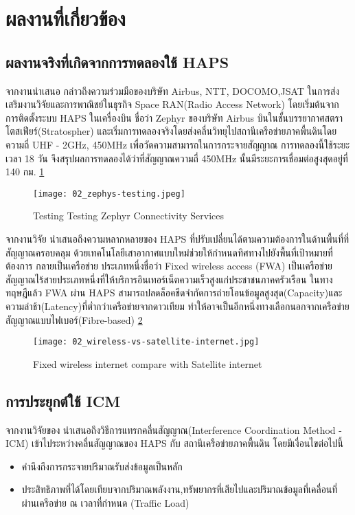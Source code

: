 \section{ผลงานที่เกี่ยวข้อง}

\subsection{ผลงานจริงที่เกิดจากการทดลองใช้ HAPS}

จากงานนำเสนอ \cite[Spacecompass]{HAPS Strategy of Space Compass}
กล่าวถึงความร่วมมือของบริษัท Airbus, NTT, DOCOMO,JSAT ในการส่งเสริมงานวิจัยและการพาณิชย์ในธุรกิจ Space RAN(Radio Access Network)
โดยเริ่มต้นจากการติดตั้งระบบ HAPS ในเครื่องบิน ชื่อว่า Zephyr ของบริษัท Airbus บินในชั้นบรรยากาศสตราโตสเฟียร์(Stratospher) 
และเริ่มการทดลองจริงโดยส่งคลื่นวิทยุไปสถานีเครือข่ายภาคพื้นดินโดยความถี่
UHF - 2GHz, 450MHz เพื่อวัดความสามารถในการกระจายสัญญาณ การทดลองนี้ใช้ระยะเวลา 18 วัน 
จึงสรุปผลการทดลองได้ว่าที่สัญญาณความถี่ 450MHz นั้นมีระยะการเชื่อมต่อสูงสุดอยู่ที่ 140 กม. \ref{fig:02-zephyr-testing}

\begin{figure}[h]
\centering
\caption[Testing Zephyr]{Testing Testing Zephyr Connectivity Services} 
\label{fig:02-zephyr-testing}
\texttt{[image: 02\_zephys-testing.jpeg]}
\end{figure}

จากงานวิจัย \cite[Towers]{High Altitude Platform Systems: Towers in the Skies}
นำเสนอถึงความหลากหลายของ HAPS ที่ปรับเปลี่ยนได้ตามความต้องการในด้านพื้นที่ที่สัญญาณครอบคลุม ด้วยเทคโนโลยีเสาอากาศแบบใหม่ช่วยให้กำหนดทิศทางไปยังพื้นที่เป้าหมายที่ต้องการ กลายเป็นเครือข่าย
ประเภทหนึ่งชื่อว่า Fixed wireless access (FWA) เป็นเครือข่ายสัญญาณไร้สายประเภทหนึ่งที่ให้บริการอินเทอร์เน็ตความเร็วสูงแก่ประชาชนภาคครัวเรือน ในทางทฤษฎีแล้ว
FWA ผ่าน HAPS สามารถปลดล็อคขีดจำกัดการถ่ายโอนข้อมูลสูงสุด(Capacity)และความล่าช้า(Latency)ที่ต่ำกว่าเครือข่ายจากดาวเทียม
ทำให้อาจเป็นอีกหนึ่งทางเลือกนอกจากเครือข่ายสัญญาณแบบไฟเบอร์(Fibre-based) \ref{fig:02-wireless-vs-satellite}

\begin{figure}[h]
\centering
\caption[wireless vs satellite]{Fixed wireless internet compare with Satellite internet}
\label{fig:02-wireless-vs-satellite}
\texttt{[image: 02\_wireless-vs-satellite-internet.jpg]}
\end{figure}

\subsection{การประยุกต์ใช้ ICM}

จากงานวิจัยของ \cite[liu2021interference]{Interference Coordination Method for Integrated HAPS-Terrestrial Networks}
นำเสนอถึงวิธีการแทรกคลื่นสัญญาณ(Interference Coordination Method - ICM) เข้าไประหว่างคลื่นสัญญาณของ HAPS กับ สถานีเครือข่ายภาคพื้นดิน โดยมีเงื่อนไขต่อไปนี้
\begin{itemize}
    \item คำนึงถึงการกระจายปริมาณรับส่งข้อมูลเป็นหลัก 
    \item ประสิทธิภาพที่ได้โดยเทียบจากปริมาณพลังงาน,ทรัพยากรที่เสียไปและปริมาณข้อมูลที่เคลื่อนที่ผ่านเครือข่าย ณ เวลาที่กำหนด (Traffic Load)
\end{itemize}